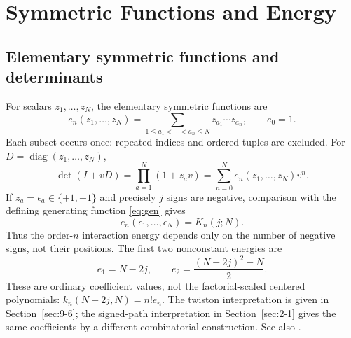 \chapter{Symmetric Functions and Energy}
\label{ch:4}
\section{Elementary symmetric functions and determinants}
\label{sec:4-1}
For scalars $z_1,\ldots,z_N$, the elementary symmetric functions are
\[
e_n(z_1,\ldots,z_N)=\sum_{1\leq a_1<\cdots<a_n\leq N}
z_{a_1}\cdots z_{a_n},\qquad e_0=1.
\]
Each subset occurs once: repeated indices and ordered tuples are excluded.
For $D=\operatorname{diag}(z_1,\ldots,z_N)$,
\begin{equation}\label{eq:elementary-energy-generating}
\det(I+vD)=\prod_{a=1}^N(1+z_av)
=\sum_{n=0}^N e_n(z_1,\ldots,z_N)v^n.
\end{equation}
If $z_a=\epsilon_a\in\{+1,-1\}$ and precisely $j$ signs are negative,
comparison with the defining generating function \eqref{eq:gen} gives
\begin{equation}\label{eq:sign-energy-Krawtchouk}
e_n(\epsilon_1,\ldots,\epsilon_N)=K_n(j;N).
\end{equation}
Thus the order-$n$ interaction energy depends only on the number of
negative signs, not their positions. The first two nonconstant energies are
\[
e_1=N-2j,\qquad e_2=\frac{(N-2j)^2-N}{2}.
\]
These are ordinary coefficient values, not the factorial-scaled centered
polynomials: $k_n(N-2j,N)=n!e_n$.
The twiston interpretation is given in Section~\ref{sec:9-6}; the signed-path
interpretation in Section~\ref{sec:2-1} gives the same coefficients by a
different combinatorial construction. See also \cite[Sections~1 and~5]{KocikFeynman}.

